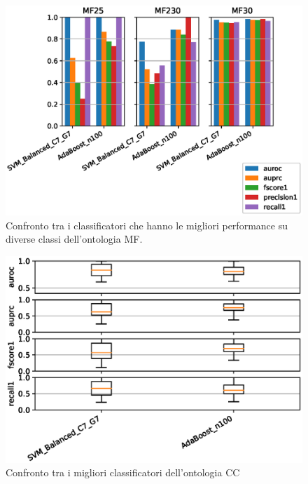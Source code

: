 \documentclass[12pt,a4paper,oneside,hidelinks]{report}
\begin{document}
\begin{figure}[hb]%
    \centering
    \includegraphics[scale = 0.80]{MF-level2.eps}%
    \caption{Confronto tra i classificatori che hanno le migliori performance su diverse classi dell'ontologia MF.}%
    \label{figure:liv21}%
\end{figure}

\vspace*{\fill}



\vspace*{\fill}

\begin{figure}[ht]%
    \centering
    \includegraphics[scale = 0.80]{CC-level3.eps}%
    \caption{Confronto tra i migliori classificatori dell'ontologia CC}%
    \label{fig:liv3} 
\end{figure}
\end{document}
